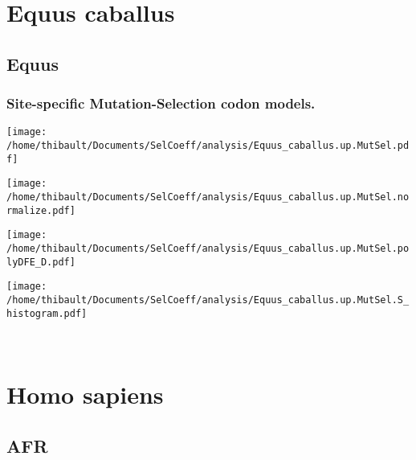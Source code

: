 \section{Equus caballus} 
 
\subsection{Equus} 
 
\subsubsection*{Site-specific Mutation-Selection codon models.} 
\begin{minipage}{0.49\linewidth} 
\texttt{[image: /home/thibault/Documents/SelCoeff/analysis/Equus\_caballus.up.MutSel.pdf]} 
\end{minipage}
\begin{minipage}{0.49\linewidth} 
\texttt{[image: /home/thibault/Documents/SelCoeff/analysis/Equus\_caballus.up.MutSel.normalize.pdf]} 
\end{minipage}
\begin{minipage}{0.49\linewidth} 
\texttt{[image: /home/thibault/Documents/SelCoeff/analysis/Equus\_caballus.up.MutSel.polyDFE\_D.pdf]} 
\end{minipage}
\begin{minipage}{0.49\linewidth} 
\texttt{[image: /home/thibault/Documents/SelCoeff/analysis/Equus\_caballus.up.MutSel.S\_histogram.pdf]} 
\end{minipage}
\\ 
\section{Homo sapiens} 
 
\subsection{AFR} 
 
